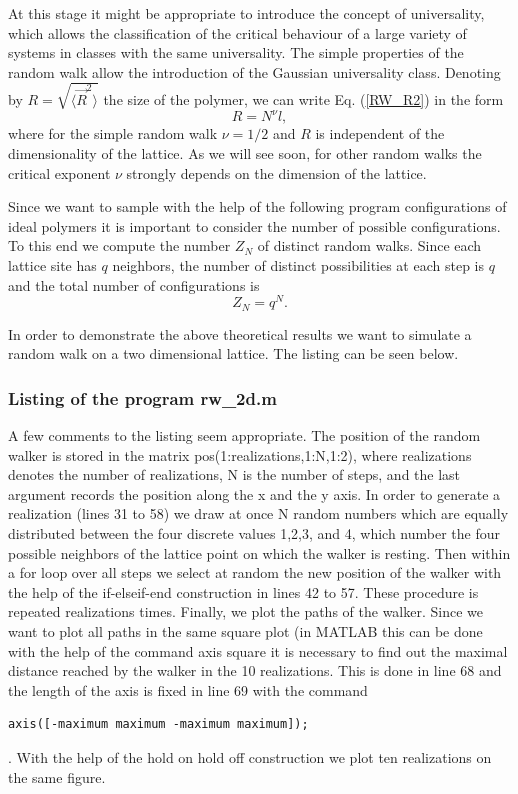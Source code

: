 At this stage it might be appropriate to introduce the concept of 
universality, which allows the classification of the critical 
behaviour of a large variety of systems in classes with the same 
universality. The simple properties of the random walk allow the 
introduction of the Gaussian universality class. Denoting by
$R = \sqrt{\langle \vec{R}^2\rangle}$ the size of the polymer, we 
can write  Eq. (\ref{RW_R2}) in the form
\begin{equation*}
R = N^{\nu}l,
\end{equation*}
where for the simple random walk $\nu = 1/2$ and $R$ is independent of 
the dimensionality of the lattice. As we will see soon, for other 
random walks the critical exponent $\nu$ strongly depends on the 
dimension of the lattice.

Since we want to sample with the help of the following program
configurations of ideal polymers it is important to consider the 
number of possible configurations. To this end we compute the 
number $Z_N$ of distinct random walks. Since each lattice site 
has $q$ neighbors,
the number of distinct possibilities at each step is $q$ and the 
total number of configurations is
\begin{equation}
\label{Z_NRW}
Z_N = q^N.
\end{equation}

In order to demonstrate the above theoretical results we want to 
simulate a random walk on a two dimensional lattice.
The listing can be seen below.

\subsubsection{Listing of the program rw\_2d.m}

A few comments to the listing seem appropriate. 
The position of the random walker is stored in the matrix
{\sf pos(1:realizations,1:N,1:2)}, where {\sf realizations} denotes
the number of realizations, {\sf N} is the number of steps, and 
the last argument records the position along the x and the y axis.
In order to generate a realization (lines 31 to 58) we draw at 
once N random numbers which are equally distributed between the 
four discrete values 1,2,3, and 4, which number the four
possible neighbors of the lattice point on which the walker is 
resting. Then within a for loop over all steps 
we select at random the new position of the walker
with the help of the if-elseif-end construction in lines
42 to 57. These procedure is repeated {\sf realizations} times.
Finally, we plot the paths of the walker. Since we want to plot 
all paths in the same square plot (in MATLAB this can be done
with the help of the command {\sf axis square} it is necessary to find out
the maximal distance reached by the walker in the 10 realizations.
This is done in line 68 and the length of the axis is fixed in 
line 69 with the command
\begin{verbatim}
axis([-maximum maximum -maximum maximum]);
\end{verbatim}. 
With the help of the {\sf hold on} {\sf hold off} construction we 
plot  ten realizations on the same figure.

